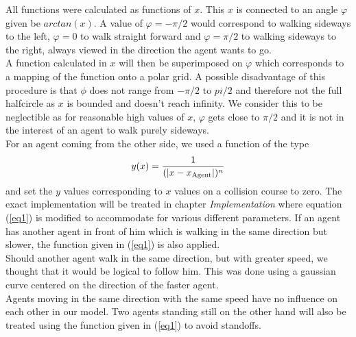 \noi All functions were calculated as functions of $x$. This $x$ is connected to an angle $\varphi$ given be $arctan(x)$. A value of $\varphi = -\pi/2$ would correspond to walking sideways to the left, $\varphi = 0$ to walk straight forward and $\varphi = \pi/2$ to walking sideways to the right, always viewed in the direction the agent wants to go.\\
A function calculated in $x$ will then be superimposed on $\varphi$ which corresponds to a mapping of the function onto a polar grid. A possible disadvantage of this procedure is that $\phi$ does not range from $-\pi/2$ to $pi/2$ and therefore not the full halfcircle as $x$ is bounded and doesn't reach infinity. We consider this to be neglectible as for reasonable high values of $x$, $\varphi$ gets close to $\pi/2$ and it is not in the interest of an agent to walk purely sideways.\\

\noi For an agent coming from the other side, we used a function of the type
\begin{equation}\label{eq1}
	y(x) = \frac{1}{(|x-x_{\text{Agent}}|)^n}
\end{equation}
\noi and set the $y$ values corresponding to $x$ values on a collision course to zero. The exact implementation will be treated in chapter \textit{Implementation} where equation (\ref{eq1}) is modified to accommodate for various different parameters. If an agent has another agent in front of him which is walking in the same direction but slower, the function given in (\ref{eq1}) is also applied.\\
Should another agent walk in the same direction, but with greater speed, we thought that it would be logical to follow him. This was done using a gaussian curve centered on the direction of the faster agent.\\
Agents moving in the same direction with the same speed have no influence on each other in our model. Two agents standing still on the other hand will also be treated using the function given in (\ref{eq1}) to avoid standoffs.



